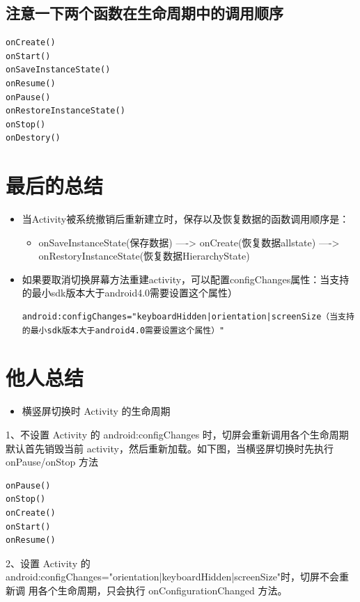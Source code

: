 \documentclass[9pt, b5paaper]{book}
\begin{document}
\subsection{注意一下两个函数在生命周期中的调用顺序}
\label{sec-1-3-4}
\begin{verbatim}
onCreate()
onStart()
onSaveInstanceState()
onResume()
onPause()
onRestoreInstanceState()
onStop()
onDestory()
\end{verbatim}
\section{最后的总结}
\label{sec-1-4}
\begin{itemize}
\item 当Activity被系统撤销后重新建立时，保存以及恢复数据的函数调用顺序是：
\begin{itemize}
\item onSaveInstanceState(保存数据) ----> onCreate(恢复数据allstate) ----> onRestoryInstanceState(恢复数据HierarchyState)
\end{itemize}
\item 如果要取消切换屏幕方法重建activity，可以配置configChanges属性：当支持的最小sdk版本大于android4.0需要设置这个属性）
\begin{verbatim}
android:configChanges="keyboardHidden|orientation|screenSize（当支持的最小sdk版本大于android4.0需要设置这个属性）"
\end{verbatim}
\end{itemize}

\section{他人总结}
\label{sec-1-5}
\begin{itemize}
\item 横竖屏切换时 Activity 的生命周期
\end{itemize}
1、不设置 Activity 的 android:configChanges 时，切屏会重新调用各个生命周期 默认首先销毁当前 activity，然后重新加载。如下图，当横竖屏切换时先执行 onPause/onStop 方法
\begin{verbatim}
onPause()
onStop()
onCreate()
onStart()
onResume()
\end{verbatim}
2、设置 Activity 的 android:configChanges="orientation|keyboardHidden|screenSize"时，切屏不会重新调 用各个生命周期，只会执行 onConfigurationChanged 方法。
\end{document}
